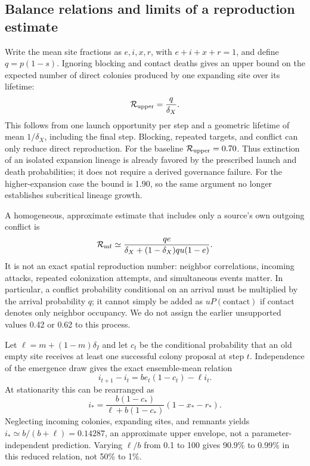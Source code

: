 \documentclass[10pt,twocolumn]{article}
\begin{document}
\subsection{Balance relations and limits of a reproduction estimate}
Write the mean site fractions as $e,i,x,r$, with $e+i+x+r=1$,
and define $q=p(1-s)$. Ignoring blocking and contact deaths gives an
upper bound on the expected number of direct colonies produced by one
expanding site over its lifetime:
\begin{equation}
\mathcal R_{\rm upper}=\frac{q}{\delta_X}.
\label{eq:upper}
\end{equation}
This follows from one launch opportunity per step and a geometric lifetime
of mean $1/\delta_X$, including the final step. Blocking, repeated
targets, and conflict can only reduce direct reproduction. For the
baseline $\mathcal R_{\rm upper}=0.70$. Thus extinction of an isolated
expansion lineage is already favored by the prescribed launch and death
probabilities; it does not require a derived governance failure.
For the higher-expansion case the bound is 1.90, so the same argument
no longer establishes subcritical lineage growth.

A homogeneous, approximate estimate that includes only a source's own
outgoing conflict is
\begin{equation}
\mathcal R_{\rm mf}\simeq
\frac{q e}{\delta_X+(1-\delta_X)q u(1-e)}.
\label{eq:mf}
\end{equation}
It is not an exact spatial reproduction number: neighbor correlations,
incoming attacks, repeated colonization attempts, and simultaneous
events matter. In particular, a conflict probability conditional on an
arrival must be multiplied by the arrival probability $q$; it cannot
simply be added as $uP(\mathrm{contact})$ if contact denotes only neighbor
occupancy. We do not assign the earlier unsupported values 0.42 or 0.62
to this process.

Let $\ell=m+(1-m)\delta_I$ and let $c_t$ be the conditional probability
that an old empty site receives at least one successful colony proposal
at step $t$. Independence of the emergence draw gives the exact
ensemble-mean relation
\begin{equation}
i_{t+1}-i_t=b e_t(1-c_t)-\ell i_t.
\label{eq:balance}
\end{equation}
At stationarity this can be rearranged as
\begin{equation}
i_* = \frac{b(1-c_*)}{\ell+b(1-c_*)}(1-x_*-r_*).
\label{eq:equilibrium}
\end{equation}
Neglecting incoming colonies, expanding sites, and remnants yields
$i_*\simeq b/(b+\ell)=0.14287$, an approximate upper envelope,
not a parameter-independent prediction. Varying $\ell/b$ from 0.1
to 100 gives 90.9\% to 0.99\% in this reduced relation, not
50\% to 1\%.
\end{document}
